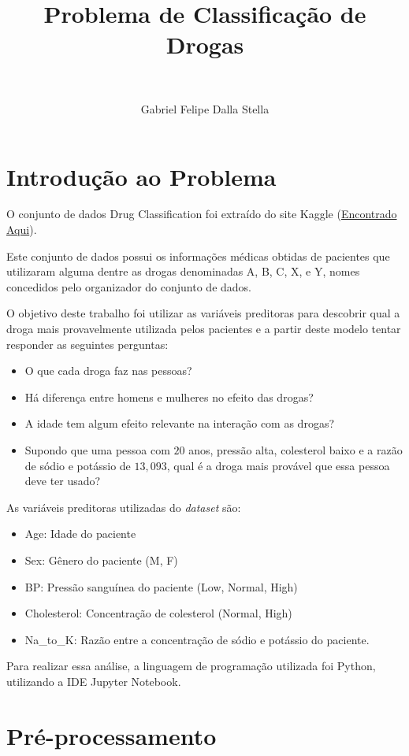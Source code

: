 \documentclass[12pt,a4paper]{article}
\title{Problema de Classificação de Drogas}
\author{Gabriel Felipe Dalla Stella}
\subtitle{\ }
\theoremstyle{definition}
\theoremstyle{theoremdd}
\begin{document}
\maketitle
\section{Introdução ao Problema}
O conjunto de dados Drug Classification foi extraído do site Kaggle (\href{https://www.kaggle.com/prathamtripathi/drug-classification}{Encontrado Aqui}).

Este conjunto de dados possui os informações médicas obtidas de pacientes que utilizaram alguma dentre as drogas denominadas A, B, C, X, e Y, nomes concedidos pelo organizador do conjunto de dados.

O objetivo deste trabalho foi utilizar as variáveis preditoras para descobrir qual a droga mais provavelmente utilizada pelos pacientes e a partir deste modelo tentar responder as seguintes perguntas:
\begin{itemize}
\item O que cada droga faz nas pessoas?
\item Há diferença entre homens e mulheres no efeito das drogas?
\item A idade tem algum efeito relevante na interação com as drogas?
\item Supondo que uma pessoa com $20$ anos, pressão alta, colesterol baixo e a razão de sódio e potássio de $13,093$, qual é a droga mais provável que essa pessoa deve ter usado?
\end{itemize}


As variáveis preditoras utilizadas do \textit{dataset} são:
\begin{itemize}
\item Age: Idade do paciente
\item Sex: Gênero do paciente (M, F)
\item BP: Pressão sanguínea do paciente (Low, Normal, High)
\item Cholesterol: Concentração de colesterol (Normal, High)
\item Na\_to\_K: Razão entre a concentração de sódio e potássio do paciente.
\end{itemize}

Para realizar essa análise, a linguagem de programação utilizada foi Python, utilizando a IDE Jupyter Notebook.

\section{Pré-processamento}
\end{document}
